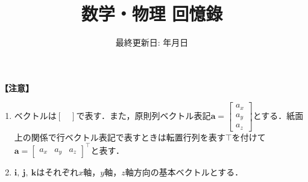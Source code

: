 \documentclass[
	report, paper=a4, head_space=23mm, foot_space=13mm,
	fontsize=9pt, jafontscale=0.9,
	gutter=20mm, line_length=170mm,
	fleqn, twoside
]{jlreq}
\makeatletter
\newcommand*{\themonth}{\two@digits\month}
\newcommand*{\theday}{\two@digits\day}
\renewcommand{\today}{{\the\year}年{\themonth}月{\theday}日}
\makeatother
\begin{document}
\title{\fontsize{40pt}{1\zh} 数学・物理 回憶錄}
\date{\LARGE 最終更新日: \today}
\maketitle


\noindent
\textbf{【注意】}
\begin{enumerate}[leftmargin=15pt]
	\item ベクトルは$[\quad]$で表す．また，原則列ベクトル表記$\bm{a} =
		\begin{bmatrix}
			a_x\\ a_y\\ a_z
		\end{bmatrix}$とする．紙面上の関係で行ベクトル表記で表すときは転置行列を表す$\top$を付けて$\bm{a} =
		{
			\begin{bmatrix}
			a_x & a_y & a_z
		\end{bmatrix}
		}^\top$と表す．
	\item $\bm{i},\ \bm{j},\ \bm{k}$はそれぞれ$x$軸，$y$軸，$z$軸方向の基本ベクトルとする．
\end{enumerate}



% 
% 
% 




% 
% 
% 
% 

% 
% 
% 
% 


% 
% 


\end{document}
